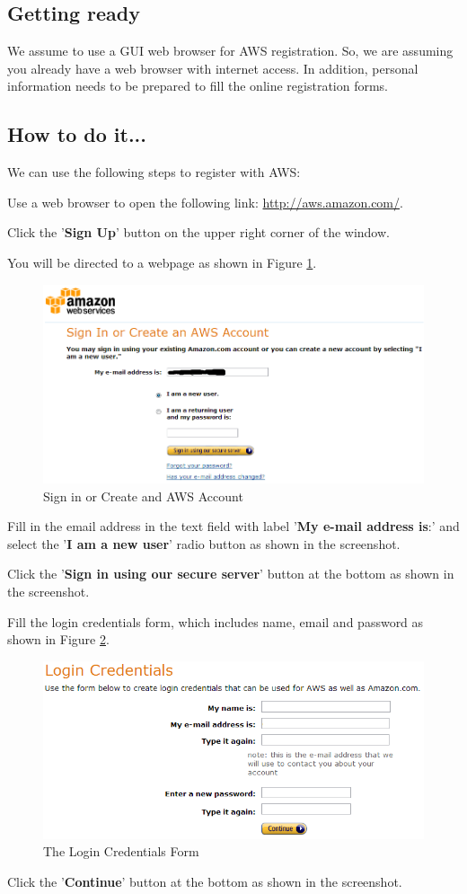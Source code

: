 \subsection*{Getting ready}
We assume to use a GUI web browser for AWS registration. So, we are assuming you already have a web browser with internet access. In addition, personal information needs to be prepared to fill the online registration forms.
\subsection*{How to do it...}
We can use the following steps to register with AWS:

Use a web browser to open the following link: \url{http://aws.amazon.com/}.

Click the '\textbf{Sign Up}' button on the upper right corner of the window.

You will be directed to a webpage as shown in Figure \ref{fig:aws.signin}.
\begin{figure}[ht]
  \centering
  \includegraphics[width=.8\textwidth]{figs/5163os_08_01.png}
  \caption{Sign in or Create and AWS Account}\label{fig:aws.signin}
\end{figure} 
Fill in the email address in the text field with label '\textbf{My e-mail address is}:' and select the '\textbf{I am a new user}' radio button as shown in the screenshot.

Click the '\textbf{Sign in using our secure server}' button at the bottom as shown in the screenshot.

Fill the login credentials form, which includes name, email and password as shown in Figure \ref{fig:login.credentials}.
\begin{figure}[ht]
  \centering
  \includegraphics[width=.8\textwidth]{figs/5163os_08_02.png}
  \caption{The Login Credentials Form}\label{fig:login.credentials}
\end{figure} 
Click the '\textbf{Continue}' button at the bottom as shown in the screenshot.

